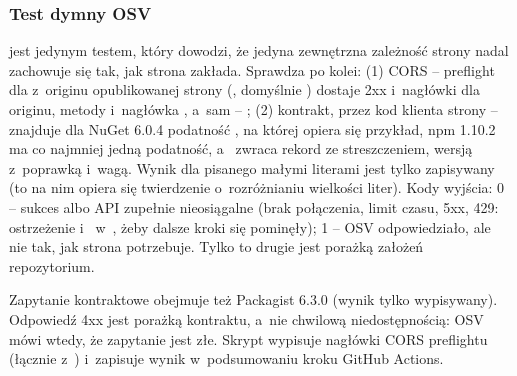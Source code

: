 \subsubsection{Test dymny OSV}

 jest jedynym testem, który dowodzi, że jedyna zewnętrzna
zależność strony nadal zachowuje się tak, jak strona zakłada. Sprawdza po kolei: (1) CORS --
preflight  dla  z~originu opublikowanej strony
(, domyślnie ) dostaje 2xx
i~nagłówki  dla originu, metody  i~nagłówka
, a~sam  -- ;
(2) kontrakt, przez kod klienta strony --  znajduje dla NuGet
 6.0.4 podatność , na której opiera się
przykład, npm  1.10.2 ma co najmniej jedną podatność, a~
zwraca rekord ze streszczeniem, wersją z~poprawką i~wagą. Wynik dla
 pisanego małymi literami jest tylko zapisywany (to na nim opiera się
twierdzenie o~rozróżnianiu wielkości liter). Kody wyjścia: 0 -- sukces albo API zupełnie
nieosiągalne (brak połączenia, limit czasu, 5xx, 429: ostrzeżenie i~
w~, żeby dalsze kroki się pominęły); 1 -- OSV odpowiedziało, ale nie
tak, jak strona potrzebuje. Tylko to drugie jest porażką założeń repozytorium.

Zapytanie kontraktowe obejmuje też Packagist  6.3.0 (wynik tylko
wypisywany). Odpowiedź 4xx jest porażką kontraktu, a~nie chwilową niedostępnością: OSV mówi
wtedy, że zapytanie jest złe. Skrypt wypisuje nagłówki CORS preflightu (łącznie
z~) i~zapisuje wynik w~podsumowaniu kroku GitHub Actions.


